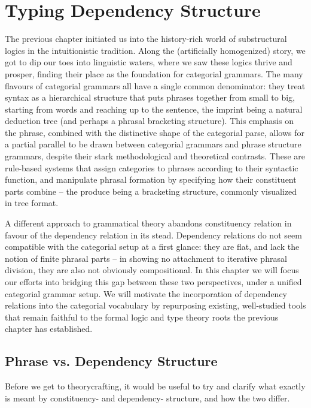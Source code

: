 \chapter{Typing Dependency Structure}
\label{chapter:chapter_2}


The previous chapter initiated us into the history-rich world of substructural logics in the intuitionistic tradition.
Along the (artificially homogenized) story, we got to dip our toes into linguistic waters, where we saw these logics thrive and prosper, finding their place as the foundation for categorial grammars.
The many flavours of categorial grammars all have a single common denominator: they treat syntax as a hierarchical structure that puts phrases together from small to big, starting from words and reaching up to the sentence, the imprint being a natural deduction tree (and perhaps a phrasal bracketing structure).
This emphasis on the phrase, combined with the distinctive shape of the categorial parse, allows for a partial parallel to be drawn between categorial grammars and phrase structure grammars, despite their stark methodological and theoretical contrasts.
These are rule-based systems that assign categories to phrases according to their syntactic function, and manipulate phrasal formation by specifying how their constituent parts combine -- the produce being a bracketing structure, commonly visualized in tree format.

A different approach to grammatical theory abandons constituency relation in favour of the dependency relation in its stead.
Dependency relations do not seem compatible with the categorial setup at a first glance: they are flat, and lack the notion of finite phrasal parts -- in showing no attachment to iterative phrasal division, they are also not obviously compositional.
In this chapter we will focus our efforts into bridging this gap between these two perspectives, under a unified categorial grammar setup.
We will motivate the incorporation of dependency relations into the categorial vocabulary by repurposing existing, well-studied tools that remain faithful to the formal logic and type theory roots the previous chapter has established.

\section{Phrase vs. Dependency Structure}
Before we get to theorycrafting, it would be useful to try and clarify what exactly is meant by constituency- and dependency- structure, and how the two differ.

